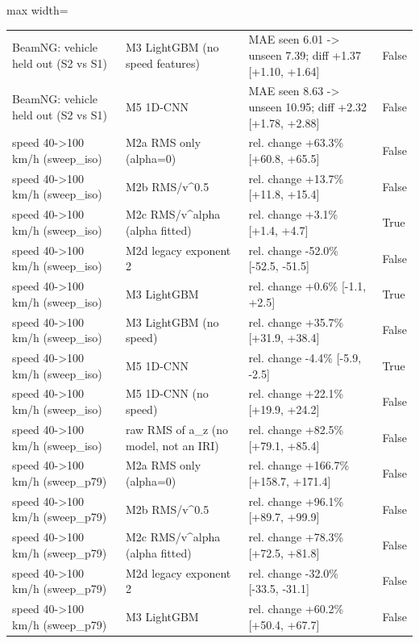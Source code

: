 \begin{table}[!htbp]
\begin{adjustbox}{max width=\columnwidth}
\begin{tabular}{>{\raggedright\arraybackslash}p{4.3cm}>{\raggedright\arraybackslash}p{4.3cm}>{\raggedright\arraybackslash}p{6.4cm}l}
BeamNG: vehicle held out (S2 vs S1) & M3 LightGBM (no speed features) & MAE seen 6.01 -\textgreater{} unseen 7.39; diff +1.37 [+1.10, +1.64] & False \\
BeamNG: vehicle held out (S2 vs S1) & M5 1D-CNN & MAE seen 8.63 -\textgreater{} unseen 10.95; diff +2.32 [+1.78, +2.88] & False \\
speed 40-\textgreater{}100 km/h (sweep\_iso) & M2a RMS only (alpha=0) & rel. change +63.3\% [+60.8, +65.5] & False \\
speed 40-\textgreater{}100 km/h (sweep\_iso) & M2b RMS/v\textasciicircum{}0.5 & rel. change +13.7\% [+11.8, +15.4] & False \\
speed 40-\textgreater{}100 km/h (sweep\_iso) & M2c RMS/v\textasciicircum{}alpha (alpha fitted) & rel. change +3.1\% [+1.4, +4.7] & True \\
speed 40-\textgreater{}100 km/h (sweep\_iso) & M2d legacy exponent 2 & rel. change -52.0\% [-52.5, -51.5] & False \\
speed 40-\textgreater{}100 km/h (sweep\_iso) & M3 LightGBM & rel. change +0.6\% [-1.1, +2.5] & True \\
speed 40-\textgreater{}100 km/h (sweep\_iso) & M3 LightGBM (no speed) & rel. change +35.7\% [+31.9, +38.4] & False \\
speed 40-\textgreater{}100 km/h (sweep\_iso) & M5 1D-CNN & rel. change -4.4\% [-5.9, -2.5] & True \\
speed 40-\textgreater{}100 km/h (sweep\_iso) & M5 1D-CNN (no speed) & rel. change +22.1\% [+19.9, +24.2] & False \\
speed 40-\textgreater{}100 km/h (sweep\_iso) & raw RMS of a\_z (no model, not an IRI) & rel. change +82.5\% [+79.1, +85.4] & False \\
speed 40-\textgreater{}100 km/h (sweep\_p79) & M2a RMS only (alpha=0) & rel. change +166.7\% [+158.7, +171.4] & False \\
speed 40-\textgreater{}100 km/h (sweep\_p79) & M2b RMS/v\textasciicircum{}0.5 & rel. change +96.1\% [+89.7, +99.9] & False \\
speed 40-\textgreater{}100 km/h (sweep\_p79) & M2c RMS/v\textasciicircum{}alpha (alpha fitted) & rel. change +78.3\% [+72.5, +81.8] & False \\
speed 40-\textgreater{}100 km/h (sweep\_p79) & M2d legacy exponent 2 & rel. change -32.0\% [-33.5, -31.1] & False \\
speed 40-\textgreater{}100 km/h (sweep\_p79) & M3 LightGBM & rel. change +60.2\% [+50.4, +67.7] & False \\

\end{tabular}
\end{adjustbox}
\end{table}
